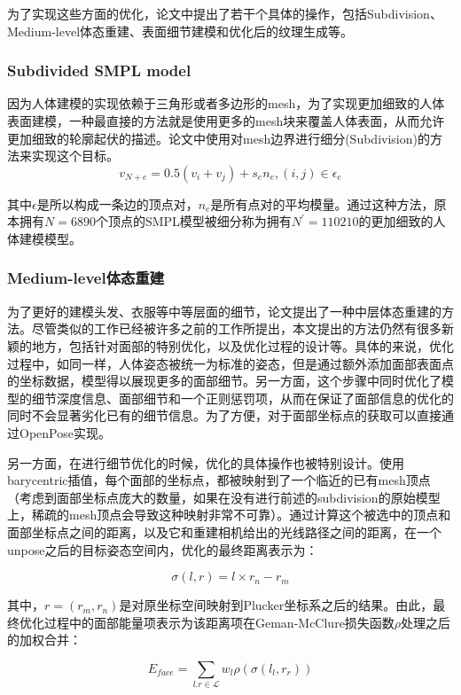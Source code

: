\documentclass{article}
\begin{document}
为了实现这些方面的优化，论文中提出了若干个具体的操作，包括Subdivision、Medium-level体态重建、表面细节建模和优化后的纹理生成等。
\subsubsection{Subdivided SMPL model}
因为人体建模的实现依赖于三角形或者多边形的mesh，为了实现更加细致的人体表面建模，一种最直接的方法就是使用更多的mesh块来覆盖人体表面，从而允许更加细致的轮廓起伏的描述。论文中使用对mesh边界进行细分(Subdivision)的方法来实现这个目标。
\begin{equation}
	v_{N+e} = 0.5(v_i + v_j) + s_e n_e, (i,j) \in \epsilon_e
\end{equation}

其中$\epsilon$是所以构成一条边的顶点对，$n_e$是所有点对的平均模量。通过这种方法，原本拥有$N=6890$个顶点的SMPL模型被细分称为拥有$N^\prime = 110210$的更加细致的人体建模模型。
\subsubsection{Medium-level体态重建}
为了更好的建模头发、衣服等中等层面的细节，论文提出了一种中层体态重建的方法。尽管类似的工作已经被许多之前的工作所提出，本文提出的方法仍然有很多新颖的地方，包括针对面部的特别优化，以及优化过程的设计等。具体的来说，优化过程中，如同\cite{paper1}一样，人体姿态被统一为标准的姿态，但是通过额外添加面部表面点的坐标数据，模型得以展现更多的面部细节。另一方面，这个步骤中同时优化了模型的细节深度信息、面部细节和一个正则惩罚项，从而在保证了面部信息的优化的同时不会显著劣化已有的细节信息。为了方便，对于面部坐标点的获取可以直接通过OpenPose\cite{openpose}实现。

另一方面，在进行细节优化的时候，优化的具体操作也被特别设计。使用barycentric插值，每个面部的坐标点，都被映射到了一个临近的已有mesh顶点（考虑到面部坐标点庞大的数量，如果在没有进行前述的subdivision的原始模型上，稀疏的mesh顶点会导致这种映射非常不可靠）。通过计算这个被选中的顶点和面部坐标点之间的距离，以及它和重建相机给出的光线路径之间的距离，在一个unpose\cite{paper1}之后的目标姿态空间内，优化的最终距离表示为：

\begin{equation}
	\sigma(l, r) = l \times r_n - r_m
\end{equation}

其中，$r=(r_m, r_n)$是对原坐标空间映射到Plucker坐标系之后的结果。由此，最终优化过程中的面部能量项表示为该距离项在Geman-McClure损失函数$\rho$处理之后的加权合并：

\begin{equation}
	E_{face} = \sum_{l.r\in \mathcal{L}} w_l\rho(\sigma(l_l, r_r))
\end{equation}
\end{document}
